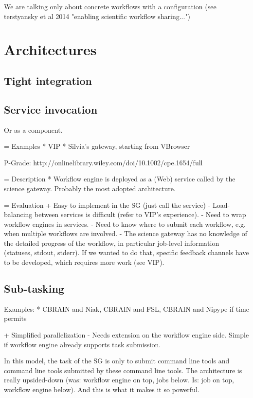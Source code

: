 \documentclass[11pt]{article}
\begin{document}
We are talking only about concrete workflows with a configuration (see terstyansky et al 2014 "enabling scientific workflow sharing...")

\section{Architectures}

\subsection{Tight integration}

\subsection{Service invocation}

Or as a component.

= Examples
* VIP
* Silvia's gateway, starting from VBrowser

P-Grade: http://onlinelibrary.wiley.com/doi/10.1002/cpe.1654/full

= Description 
*  Workflow engine is deployed as a (Web) service called by the
science gateway. Probably the most adopted architecture. 

= Evaluation
+ Easy to implement in the SG (just call the service)
- Load-balancing between services is difficult
(refer to VIP's experience).
- Need to wrap workflow engines in
services.
- Need to know where to submit each workflow, e.g. when
multiple workflows are involved.
- The science gateway has no
knowledge of the detailed progress of the workflow, in particular
job-level information (statuses, stdout, stderr). If we wanted to do
that, specific feedback channels have to be developed, which requires more work (see VIP).

\subsection{Sub-tasking}

Examples:
* CBRAIN and Niak, CBRAIN and FSL, CBRAIN and Nipype if time permits

+ Simplified parallelization
- Needs extension on the workflow engine side. Simple if workflow engine already supports task submission.

In  this model, the task of the SG is only to submit command line tools and command line tools submitted by these command line tools. The architecture is really upsided-down (was: workflow engine on top, jobs below. Is: job on top, workflow engine below). And this is what it makes it so powerful.
\end{document}
